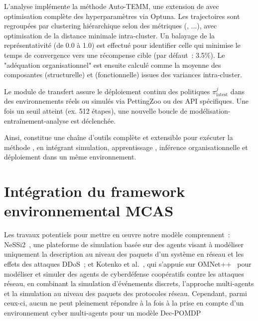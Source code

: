 L'analyse implémente la méthode Auto-TEMM, une extension de  avec optimisation complète des hyperparamètres via Optuna. Les trajectoires sont regroupées par clustering hiérarchique selon des métriques (, ...), avec optimisation de la distance minimale intra-cluster. Un balayage de la représentativité (de 0.0 à 1.0) est effectué pour identifier celle qui minimise le temps de convergence vers une récompense cible (par défaut~: 3.5\%). Le "adéquation  organisationnel" est ensuite calculé comme la moyenne des composantes  (structurelle) et  (fonctionnelle) issues des variances intra-cluster.

Le module de transfert assure le déploiement continu des politiques $\pi^j_{\text{latest}}$ dans des environnements réels ou simulés via PettingZoo ou des API spécifiques. Une fois un seuil atteint (ex. 512 étapes), une nouvelle boucle de modélisation-entraînement-analyse est déclenchée.

Ainsi,  constitue une chaîne d'outils complète et extensible pour exécuter la méthode , en intégrant simulation, apprentissage , inférence organisationnelle et déploiement dans un même environnement.



\section{Intégration du framework environnemental MCAS}

\noindent
Les travaux potentiels pour mettre en œuvre notre modèle comprennent~: NeSSi2~\cite{DGrunewald2011}, une plateforme de simulation basée sur des agents visant à modéliser uniquement la description au niveau des paquets d'un système en réseau et les effets des attaques DDoS~; et Kotenko et al.~\cite{IKotenko2007}, qui s'appuie sur OMNet++~\cite{Varga2010} pour modéliser et simuler des agents de cyberdéfense coopératifs contre les attaques réseau, en combinant la simulation d'événements discrets, l'approche multi-agents et la simulation au niveau des paquets des protocoles réseau.
Cependant, parmi ceux-ci, aucun ne peut pleinement répondre à la fois à la prise en compte d'un environnement cyber multi-agents pour un modèle Dec-POMDP

